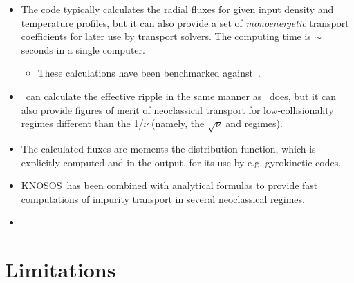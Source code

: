 \begin{itemize}
\item The code typically calculates the radial fluxes for given input density and temperature profiles, but it can also provide a set of \textit{monoenergetic} transport coefficients for later use by transport solvers. The computing time is $\sim$seconds in a single computer.
\begin{itemize}
\item These calculations have been benchmarked against~\DKES.
\end{itemize}

\item \KNOSOS~can calculate the effective ripple in the same manner as \NEO~does, but it can also provide figures of merit of neoclassical transport for low-collisionality regimes different than the 1/$\nu$ (namely, the $\sqrt{\nu}$ and  regimes).

\item The calculated fluxes are moments the distribution function, which is explicitly computed and  in the output, for its use by e.g. gyrokinetic codes.

\item KNOSOS~has been combined with analytical formulas to provide fast computations of impurity transport in several neoclassical regimes.

\item  {}

\end{itemize}


\section{Limitations}

